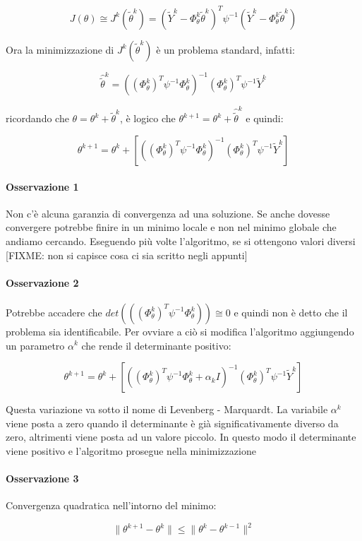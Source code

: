  \[ J(\theta)\cong J^k(\tilde{\theta}^k)=(\widetilde{Y}^k-\Phi_\theta^k\tilde{\theta}^k)^T\psi^{-1}(\widetilde{Y}^k-\Phi_\theta^k\tilde{\theta}^k) \]
  
Ora la minimizzazione di $J^k(\tilde{\theta}^k)$ è un problema standard, infatti:

  \[ \hat{\tilde{\theta}}^k=((\Phi_\theta^k)^T\psi^{-1}\Phi_\theta^k)^{-1}(\Phi_\theta^k)^T\psi^{-1}\widetilde{Y}^k \]
  
ricordando che $\theta=\theta^k+\tilde{\theta}^k$, è logico che $\theta^{k+1}=\theta^k+\hat{\tilde{\theta}}^k$ e quindi:

  \[ \theta^{k+1}=\theta^k+[((\Phi_\theta^k)^T\psi^{-1}\Phi_\theta^k)^{-1}(\Phi_\theta^k)^T\psi^{-1}\widetilde{Y}^k] \]
  
\paragraph{Osservazione 1} Non c'è alcuna garanzia di convergenza ad una soluzione. Se anche dovesse convergere potrebbe finire in un minimo locale e non nel minimo globale che andiamo cercando. Eseguendo più volte l'algoritmo, se si ottengono valori diversi [FIXME: non si capisce cosa ci sia scritto negli appunti]
\paragraph{Osservazione 2} Potrebbe accadere che $det(((\Phi_\theta^k)^T\psi^{-1}\Phi_\theta^k))\cong 0$ e quindi non è detto che il problema sia identificabile. Per ovviare a ciò si modifica l'algoritmo aggiungendo un parametro $\alpha^k$ che rende il determinante positivo:

  \[ \theta^{k+1}=\theta^k+[((\Phi_\theta^k)^T\psi^{-1}\Phi_\theta^k+\alpha_kI)^{-1}(\Phi_\theta^k)^T\psi^{-1}\widetilde{Y}^k] \]
  
Questa variazione va sotto il nome di Levenberg - Marquardt. La variabile $\alpha^k$ viene posta a zero quando il determinante è già significativamente diverso da zero, altrimenti viene posta ad un valore piccolo. In questo modo il determinante viene positivo e l'algoritmo prosegue nella minimizzazione
\paragraph{Osservazione 3} Convergenza quadratica nell'intorno del minimo:

  \[ \| \theta^{k+1}-\theta^k \|\leq \| \theta^k - \theta^{k-1}\|^2  \]
  
